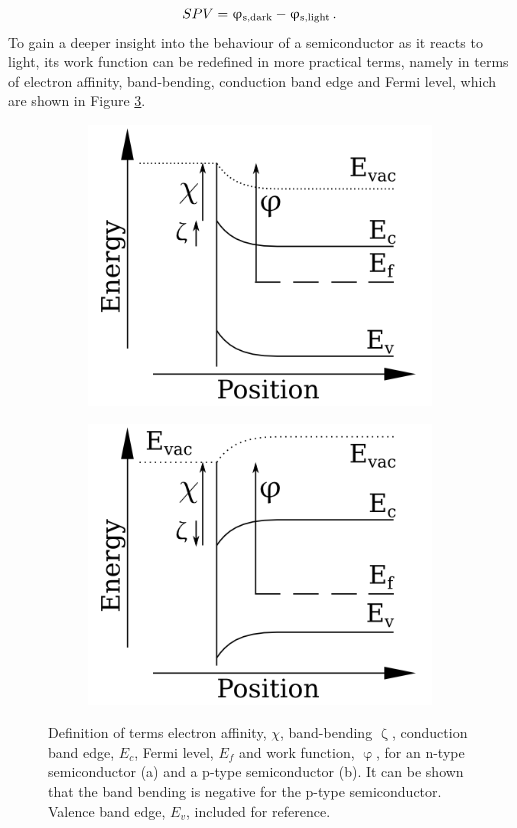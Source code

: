 \begin{equation}
\label{spvs}
	SPV = \upvarphi _{\text{s,dark}} - \upvarphi _{\text{s,light}} \, .
\end{equation}
To gain a deeper insight into the behaviour of a semiconductor as it reacts to light, its work function can be redefined in more practical terms, namely in terms of electron affinity, band-bending, conduction band edge and Fermi level, which are shown in Figure \ref{fig:terms}. 
\begin{figure}
\begin{subfigure}{0.5\textwidth}
\centering
	\includegraphics[width=0.8\linewidth]{./figs/chap2/bbdefn-2}
	\caption{}
	\label{fig:bbdefn}
\end{subfigure}
\begin{subfigure}{0.5\textwidth}
\centering
	\includegraphics[width=0.8\linewidth]{./figs/chap2/bbdefp-2}
	\caption{}
	\label{fig:bbdefp}
\end{subfigure}
\caption{Definition of terms electron affinity, $\chi$, band-bending $\upzeta$, conduction band edge, $E_c$, Fermi level, $E_f$ and work function, $\upvarphi$, for an n-type semiconductor (a) and a p-type semiconductor (b). It can be shown that the band bending is negative for the p-type semiconductor. Valence band edge, $E_v$, included for reference.}
\label{fig:terms}
\end{figure}
